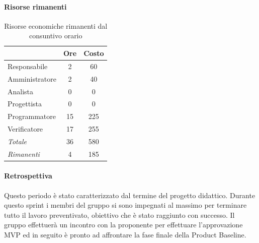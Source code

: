 \documentclass[a4paper,12pt]{article}
\begin{document}
            \paragraph{Risorse rimanenti}
                \begin{table}[H]
                \centering
                \caption{Risorse economiche rimanenti dal consuntivo orario}
                \begin{tabular}{|l|c|c|}
                \hline
                    \rowcolor{lightgray}{\textbf{Ruolo}} & {\textbf{Ore}} & {\textbf{Costo}}\\
                \hline
                    Responsabile & 2 & 60\\
                \hline
                    Amministratore & 2 & 40\\
                \hline
                    Analista & 0 & 0\\
                \hline
                    Progettista & 0 & 0\\
                \hline
                    Programmatore & 15 & 225\\
                \hline
                    Verificatore & 17 & 255\\
                \hline
                    \rowcolor{lightgray}\textit{Totale} & 36 & 580\\
                \hline
                    \rowcolor{lightgray}\textit{Rimanenti} & 4 & 185\\
                \hline
                \end{tabular}
                \end{table}
                
            \paragraph{Retrospettiva}
            Questo periodo è stato caratterizzato dal termine del progetto didattico. Durante questo sprint i membri del gruppo si sono impegnati al massimo per terminare tutto il lavoro preventivato, obiettivo che è stato raggiunto con successo.
            Il gruppo effettuerà un incontro con la proponente per effettuare l'approvazione MVP ed in seguito è pronto ad affrontare la fase finale della Product Baseline.
\end{document}
